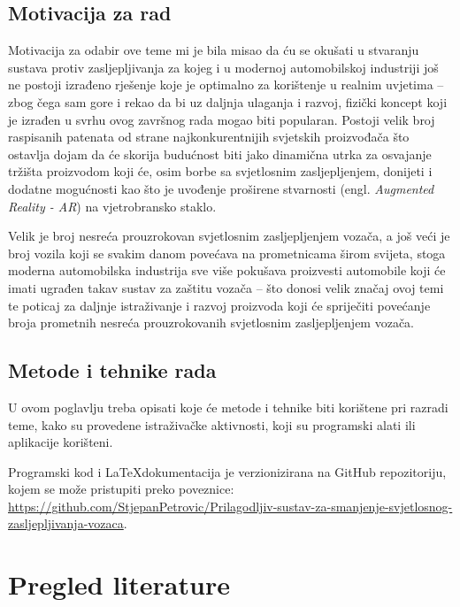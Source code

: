 \documentclass{foi}
\begin{document}
\section{Motivacija za rad}

Motivacija za odabir ove teme mi je bila misao da ću se okušati u stvaranju sustava protiv zasljepljivanja za kojeg i u modernoj automobilskoj industriji još ne postoji izrađeno rješenje koje je optimalno za korištenje u realnim uvjetima – zbog čega sam gore i rekao da bi uz daljnja ulaganja i razvoj,  fizički koncept koji je izrađen u svrhu ovog završnog rada mogao biti popularan. Postoji velik broj raspisanih patenata od strane najkonkurentnijih svjetskih proizvođača što ostavlja dojam da će skorija budućnost biti jako dinamična utrka za osvajanje tržišta proizvodom koji će, osim borbe sa svjetlosnim zasljepljenjem, donijeti i dodatne mogućnosti kao što je uvođenje proširene stvarnosti (engl. \emph{Augmented Reality - AR}) na vjetrobransko staklo.

Velik je broj nesreća prouzrokovan svjetlosnim zasljepljenjem vozača, a još veći je broj vozila koji se svakim danom povećava na prometnicama širom svijeta, stoga moderna automobilska industrija sve više pokušava proizvesti automobile koji će imati ugrađen takav sustav za zaštitu vozača – što donosi velik značaj ovoj temi te poticaj za daljnje istraživanje i razvoj proizvoda koji će spriječiti povećanje broja prometnih nesreća prouzrokovanih svjetlosnim zasljepljenjem vozača.

\section{Metode i tehnike rada}

U ovom poglavlju treba opisati koje će metode i tehnike biti korištene pri razradi teme, kako su provedene istraživačke aktivnosti, koji su programski alati ili aplikacije korišteni.

Programski kod i \LaTeX \space dokumentacija je verzionizirana na GitHub repozitoriju, kojem se može pristupiti preko poveznice: \href{https://github.com/StjepanPetrovic/Prilagodljiv-sustav-za-smanjenje-svjetlosnog-zasljepljivanja-vozaca}{https://github.com/StjepanPetrovic/Prilagodljiv-sustav-za-smanjenje-svjetlosnog-zasljepljivanja-vozaca}.

\chapter{Pregled literature}
\end{document}
